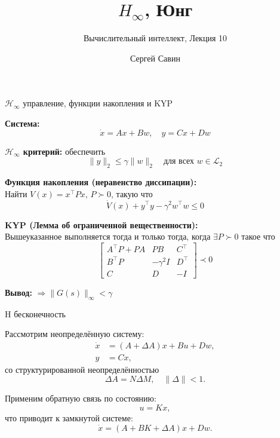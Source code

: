 \documentclass{beamer}
\title{$H_\infty$, Юнг}
\subtitle{Вычислительный интеллект, Лекция 10}
\author{Сергей Савин}
\date{\mydate}
\begin{document}
\maketitle


\begin{frame}{\texorpdfstring{$\mathcal{H}_\infty$}{} управление, функции накопления и KYP}
	\begin{flushleft}
		
		{\small
			\textbf{Система:}
			\[
			\dot{x} = Ax + Bw, \quad y = Cx + Dw
			\]
			
			
			\textbf{$\mathcal{H}_\infty$ критерий:} обеспечить
			\[
			\|y\|_2 \le \gamma \|w\|_2 \quad \text{для всех } w \in \mathcal{L}_2
			\]
			
			
			\textbf{Функция накопления (неравенство диссипации):} \\
			Найти $V(x) = x^\top P x$, $P \succ 0$, такую что
			\[
			\dot{V}(x) + y^\top y - \gamma^2 w^\top w \le 0
			\]
			
			\textbf{KYP (Лемма об ограниченной вещественности):} \\
			Вышеуказанное выполняется тогда и только тогда, когда $\exists P \succ 0$ такое что
			\[
			\begin{bmatrix}
				A^\top P + PA & PB & C^\top \\
				B^\top P & -\gamma^2 I & D^\top \\
				C & D & -I
			\end{bmatrix} \prec 0
			\]
			
			
			\textbf{Вывод:} $\Rightarrow \|G(s)\|_\infty < \gamma$}
		
	\end{flushleft}
	
\end{frame}


\begin{frame}{H бесконечность}
	\begin{flushleft}
		
		Рассмотрим неопределённую систему:
		\begin{align*}
			\dot{x} &= (A + \Delta A)x + Bu + Dw, \\
			y &= Cx,
		\end{align*}
		со структурированной неопределённостью
		\[
		\Delta A = N \Delta M, \quad \|\Delta\| < 1.
		\]
		
		Применим обратную связь по состоянию:
		\[
		u = Kx,
		\]
		что приводит к замкнутой системе:
		\[
		\dot{x} = (A + BK + \Delta A)x + Dw.
		\]
		
	\end{flushleft}
\end{frame}
\end{document}

